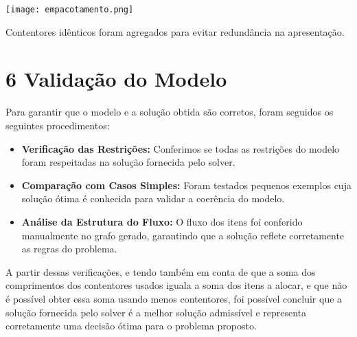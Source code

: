 \documentclass[a4paper,12pt]{article}
\begin{document}
\begin{center}
\texttt{[image: empacotamento.png]}
\end{center}

Contentores idênticos foram agregados para evitar redundância na apresentação.

\section*{6 Validação do Modelo}
Para garantir que o modelo e a solução obtida são corretos, foram seguidos os seguintes procedimentos:

\begin{itemize}
\item \textbf{Verificação das Restrições:} Conferimos se todas as restrições do modelo foram respeitadas na solução fornecida pelo solver.
\item \textbf{Comparação com Casos Simples:} Foram testados pequenos exemplos cuja solução ótima é conhecida para validar a coerência do modelo.
\item \textbf{Análise da Estrutura do Fluxo:} O fluxo dos itens foi conferido manualmente no grafo gerado, garantindo que a solução reflete corretamente as regras do problema.
\end{itemize}

A partir dessas verificações, e tendo também em conta de que a soma dos comprimentos dos contentores usados iguala a soma dos itens a alocar, e que não é possível obter essa soma usando menos contentores, foi possível concluir que a solução fornecida pelo solver é a melhor solução admissível e representa corretamente uma decisão ótima para o problema proposto.
\end{document}
